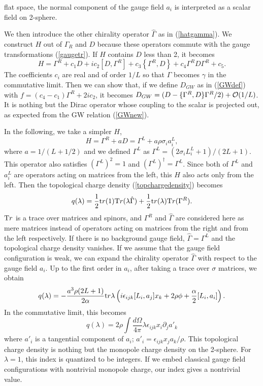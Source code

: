 \documentclass[a4paper,prl,showpacs,twocolumn]{revtex4}
\begin{document}
flat space, the normal component of the gauge field $a_i$
is interpreted as a scalar field on 2-sphere.
\par
We then introduce
the other chirality  operator $\hat{\Gamma}$ as in (\ref{hatgamma}).
We construct $H$ out of $\Gamma_R$ and $D$
because these operators commute with the gauge transformations
(\ref{gaugetr}).
If $H$ contains $D$ less than 2, it becomes
\begin{equation}
H= \Gamma^R + c_1 D+ ic_2 [D, \Gamma^R]
+ c_3 \left\{\Gamma^R,D \right\} +c_4 \Gamma^R D  \Gamma^R +c_5. 
\end{equation}
The coefficients $c_i$ are real and of order $1/L$ 
so that $\hat\Gamma$ becomes $\gamma$ in the commutative limit.
Then we can show that, if we define $D_{GW}$ 
as in (\ref{GWdef}) with
$f=(c_4-c_1)\Gamma^R +2 i c_2$, 
it becomes
$D_{GW}=(D-\{\Gamma^R,D \}\Gamma^R/2)+{\cal O}(1/L)$.
It is nothing but the Dirac operator whose
coupling to the scalar is projected out,
as expected from the GW relation (\ref{GWnew}).
\par
In the following, we take a simpler $H$,
\begin{equation}
H=\Gamma^R + a D = \Gamma^L +a \rho \sigma_i a_i^L,
\end{equation}
where $a=1/(L+1/2)$ and we defined $\Gamma^L$ 
as $\Gamma^L=(2\sigma_i L_i^L +1)/(2L+1)$.
This operator also satisfies $(\Gamma^L)^2=1$ and 
$(\Gamma^L)^{\dagger}=\Gamma^L$.
Since both of $\Gamma^L$ and $a_i^L$ are operators acting 
on matrices from the
left, this $H$ also acts only from the left.
Then the topological charge density (\ref{topchargedensity})
becomes
\begin{equation}
q(\lambda)=\frac{1}{2}{\text tr}(1)
{\text Tr} (\lambda \hat{\Gamma})
+ \frac{1}{2}{\text tr}(\lambda) {\text Tr}(\Gamma^{R}).
\end{equation}
${\text Tr}$ is a trace over matrices and spinors,
and $\Gamma^R$ and $\hat{\Gamma}$
are considered here as mere matrices instead of operators 
acting on matrices from the right and from the left respectively.
If there is no background gauge field, $\hat{\Gamma}=\Gamma^L$
and the topological charge density vanishes.
If we assume that the gauge field configuration is weak, 
we can expand the chirality operator $\hat{\Gamma}$ 
with respect to the gauge field $a_i$.
Up to the first order in $a_i$, after taking a trace over $\sigma$ matrices,
we obtain
\begin{equation}
q(\lambda)=-\frac{a^3 \rho (2L+1)}{2\alpha}  {\text tr} \lambda \left( 
i \epsilon_{ijk}[L_i, a_j]x_k +2\rho\phi+\frac{\alpha}{2}[L_i,a_i]
\right).
\end{equation}
In the commutative limit, this becomes
\begin{equation}
q(\lambda) = 2\rho \int  \frac{d \Omega}{4 \pi} 
\lambda \epsilon_{ijk} x_i \partial_j a'_k
\label{chern}
\end{equation}
where $a'_i$ is a tangential component of $a_i$;
$a'_i = {\epsilon_{ijk}x_j a_k / \rho }$. 
This topological charge density is nothing but the monopole
charge density on the 2-sphere.
For $\lambda=1$, this index is quantized to be integers.
If we embed classical gauge field configurations with
nontrivial monopole charge, our index gives a nontrivial value.
\end{document}
